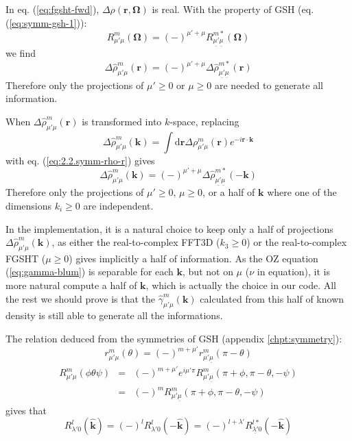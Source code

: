 In eq. (\ref{eq:fgsht-fwd}), $\Delta\rho(\mathbf{r},\mathbf{\Omega})$
is real. With the property of \acs{GSH} (eq. (\ref{eq:symm-gsh-1})):
\begin{equation}
R_{\mu'\mu}^{m}(\mathbf{\Omega})=(-)^{\mu'+\mu}R_{\underline{\mu'}\underline{\mu}}^{m*}(\mathbf{\Omega})
\end{equation}
we find
\begin{equation}
\Delta\hat{\rho}_{\mu'\mu}^{m}(\mathbf{r})=(-)^{\mu'+\mu}\Delta\hat{\rho}_{\underline{\mu'}\underline{\mu}}^{m*}(\mathbf{r})\label{eq:2.2.symm-rho-r}
\end{equation}
Therefore only the projections of $\mu'\geq0$ or $\mu\geq0$ are
needed to generate all information.

When $\Delta\hat{\rho}_{\mu'\mu}^{m}(\mathbf{r})$ is transformed
into $k$-space, replacing
\begin{equation}
\Delta\hat{\rho}_{\mu'\mu}^{m}(\mathbf{k})=\int\mathrm{d}\mathbf{r}\Delta\rho_{\mu'\mu}^{m}(\mathbf{r})e^{-i\mathbf{r}\cdot\mathbf{k}}
\end{equation}
 with eq. (\ref{eq:2.2.symm-rho-r}) gives
\begin{equation}
\Delta\hat{\rho}_{\mu'\mu}^{m}(\mathbf{k})=(-)^{\mu'+\mu}\Delta\hat{\rho}_{\underline{\mu'}\underline{\mu}}^{m*}(-\mathbf{k})\label{eq:2.2.symm-rho-k}
\end{equation}
Therefore only the projections of $\mu'\geq0$, $\mu\geq0$, or a
half of $\mathbf{k}$ where one of the dimensions $k_{i}\geq0$ are
independent. 

In the implementation, it is a natural choice to keep only a half
of projections $\Delta\hat{\rho}_{\mu'\mu}^{m}(\mathbf{k})$, as either
the real-to-complex \acs{FFT}3D ($k_{3}\geq0$) or the real-to-complex
\acs{FGSHT} ($\mu\geq0$) gives implicitly a half of information.
As the \acs{OZ} equation (\ref{eq:gamma-blum}) is separable for
each $\mathbf{k}$, but not on $\mu$ ($\nu$ in equation), it is
more natural compute a half of $\mathbf{k}$, which is actually the
choice in our code. All the rest we should prove is that the $\hat{\gamma}_{\mu'\mu}^{m}(\mathbf{k})$
calculated from this half of known density is still able to generate
all the informations.

The relation deduced from the symmetries of \acs{GSH} (appendix \ref{chpt:symmetry}):
\begin{equation}
r_{\mu'\mu}^{m}(\theta)=(-)^{m+\mu'}r_{\mu'\underline{\mu}}^{m}(\pi-\theta)
\end{equation}
\begin{eqnarray}
R_{\mu'\mu}^{m}(\phi\theta\psi) & = & (-)^{m+\mu'}e^{i\mu'\pi}R_{\mu'\underline{\mu}}^{m}(\pi+\phi,\pi-\theta,-\psi)\\
 & = & (-)^{m}R_{\mu'\underline{\mu}}^{m}(\pi+\phi,\pi-\theta,-\psi)
\end{eqnarray}
gives that
\begin{equation}
R_{\lambda'0}^{l}(\hat{\mathbf{k}})=(-)^{l}R_{\lambda'0}^{l}(-\hat{\mathbf{k}})=(-)^{l+\lambda'}R_{\underline{\lambda'}0}^{l*}(-\hat{\mathbf{k}})\label{eq:2.2.symm-lambda}
\end{equation}

